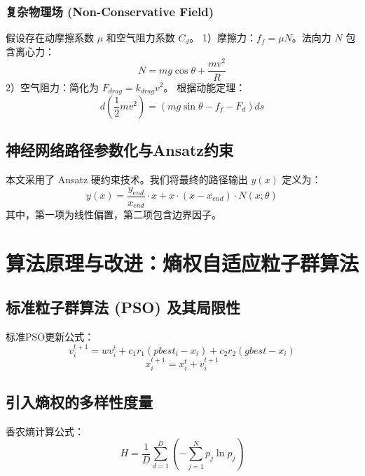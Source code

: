 \documentclass[twocolumn, UTF8, a4paper]{ctexart}
\begin{document}
	\subsubsection{复杂物理场 (Non-Conservative Field)}
	假设存在动摩擦系数 $\mu$ 和空气阻力系数 $C_d$。
	1）摩擦力：$f_f = \mu N$。法向力 $N$ 包含离心力：
	\begin{equation}
		N = mg\cos\theta + \frac{mv^2}{R}
	\end{equation}
	2）空气阻力：简化为 $F_{drag} = k_{drag}v^2$。
	根据动能定理：
	\begin{equation}
		d\left(\frac{1}{2}mv^2\right) = (mg\sin\theta - f_f - F_d)ds
	\end{equation}
	
	\subsection{神经网络路径参数化与Ansatz约束}
	本文采用了 Ansatz 硬约束技术。我们将最终的路径输出 $y(x)$ 定义为：
	\begin{equation}
		y(x) = \frac{y_{end}}{x_{end}} \cdot x + x \cdot (x - x_{end}) \cdot N(x; \theta)
	\end{equation}
	其中，第一项为线性偏置，第二项包含边界因子。
	
	\section{算法原理与改进：熵权自适应粒子群算法}
	
	\subsection{标准粒子群算法 (PSO) 及其局限性}
	标准PSO更新公式：
	\begin{equation}
		v_{i}^{t+1} = wv_{i}^t + c_1 r_1(pbest_i - x_i) + c_2 r_2(gbest - x_i)
	\end{equation}
	\begin{equation}
		x_{i}^{t+1} = x_i^t + v_{i}^{t+1}
	\end{equation}
	
	\subsection{引入熵权的多样性度量}
	香农熵计算公式：
	\begin{equation}
		H = \frac{1}{D} \sum_{d=1}^D \left( -\sum_{j=1}^N p_j \ln p_j \right)
	\end{equation}
	
\end{document}
